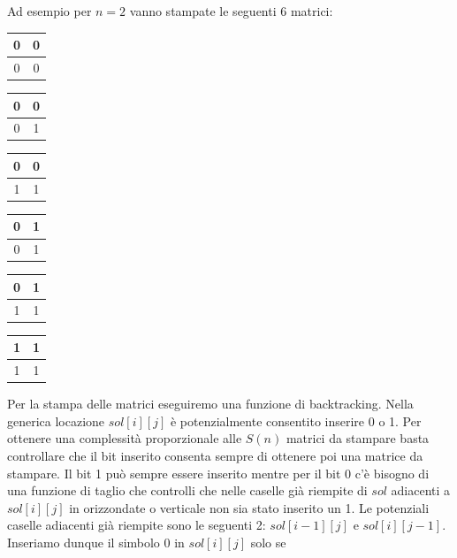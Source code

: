 Ad esempio per $n = 2$ vanno stampate le seguenti 6 matrici:
\begin{center}
\begin{tabular}{|c|c|}
     \hline
     0&0\\\hline
     0&0\\\hline
\end{tabular}\hspace{0.5cm}
\begin{tabular}{|c|c|}
     \hline
     0&0\\\hline
     0&1\\\hline
\end{tabular}\hspace{0.5cm}
\begin{tabular}{|c|c|}
     \hline
     0&0\\\hline
     1&1\\\hline
\end{tabular}\hspace{0.5cm}
\begin{tabular}{|c|c|}
     \hline
     0&1\\\hline
     0&1\\\hline
\end{tabular}\hspace{0.5cm}
\begin{tabular}{|c|c|}
     \hline
     0&1\\\hline
     1&1\\\hline
\end{tabular}\hspace{0.5cm}
\begin{tabular}{|c|c|}
     \hline
     1&1\\\hline
     1&1\\\hline
\end{tabular}
\end{center}

Per la stampa delle matrici eseguiremo una funzione di backtracking. Nella generica locazione $sol[i][j]$ è potenzialmente consentito inserire 0 o 1. Per ottenere una complessità proporzionale alle $S(n)$ matrici da stampare basta controllare che il bit inserito consenta sempre di ottenere poi una matrice da stampare. Il bit 1 può sempre essere inserito mentre per il bit 0 c’è bisogno di una funzione di taglio che controlli che nelle caselle già riempite di $sol$ adiacenti a $sol[i][j]$ in orizzondate o verticale non sia stato inserito un 1. Le potenziali caselle adiacenti già riempite sono le seguenti 2: $sol[i-1][j]$ e $sol[i][j-1]$. Inseriamo dunque il simbolo 0 in $sol[i][j]$ solo se


